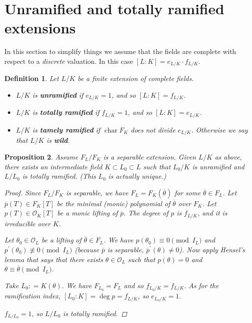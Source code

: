 \documentclass{article}
\newcommand{\term}{\textbf}
\newcommand{\dfn}{\mathrel{\mathop:}=}
\DeclareMathOperator{\fchar}{char}
\theoremstyle{myplain}
\newtheorem{proposition}{Proposition}[section]
\theoremstyle{mydefinition}
\newtheorem{definition}[proposition]{Definition}
\begin{document}
\section{Unramified and totally ramified extensions}

In this section to simplify things we assume that the fields are complete with
respect to a \emph{discrete} valuation. In this case
$[L:K] = e_{L/K}\cdot f_{L/K}$.

\begin{definition}
  Let $L/K$ be a finite extension of complete fields.

  \begin{itemize}
  \item $L/K$ is \term{unramified} if $e_{L/K} = 1$, and so $[L:K] = f_{L/K}$.

  \item $L/K$ is \term{totally ramified} if $f_{L/K} = 1$, and so
    $[L:K] = e_{L/K}$.

  \item $L/K$ is \term{tamely ramified} if $\fchar F_K$ does not divide
    $e_{L/K}$. Otherwise we say that $L/K$ is \term{wild}.
  \end{itemize}
\end{definition}

\begin{proposition}
  Assume $F_L/F_K$ is a separable extension. Given $L/K$ as above, there exists
  an intermediate field $K \subset L_0 \subset L$ such that $L_0 / K$ is
  unramified and $L / L_0$ is totally ramified. (This $L_0$ is actually unique.)

  \begin{proof}
    Since $F_L/F_K$ is separable, we have $F_L = F_K (\overline{\theta})$ for
    some $\overline{\theta} \in F_L$. Let $\overline{p} (T) \in F_K [T]$ be the
    minimal (monic) polynomial of $\overline{\theta}$ over $F_K$. Let
    $p (T) \in \mathcal{O}_K [T]$ be a monic lifting of $\overline{p}$. The degree of $p$
    is $f_{L/K}$, and it is irreducible over $K$.

    Let $\theta_0 \in \mathcal{O}_L$ be a lifting of $\overline{\theta} \in F_L$. We have
    $p (\theta_0) \equiv 0 \pmod{I_L}$ and
    $p^\prime (\theta_0) \not\equiv 0 \pmod{I_L}$ (because $\overline{p}$ is
    separable, $\overline{p}^\prime (\theta) \ne 0$). Now apply Hensel's
    lemma that says that there exists $\theta \in \mathcal{O}_L$ such that
    $p (\theta) = 0$ and $\theta \equiv \overline{\theta} \pmod{I_L}$.

    Take $L_0 \dfn K (\theta)$. We have $F_{L_0} = F_L$ and so
    $f_{L_0/K} = f_{L/K}$. As for the ramification index,
    $[L_0 : K] = \deg p = f_{L/K}$, so $e_{L_0/K} = 1$.

    $f_{L/L_0} = 1$, so $L/L_0$ is totally ramified.
  \end{proof}
\end{proposition}
\end{document}
